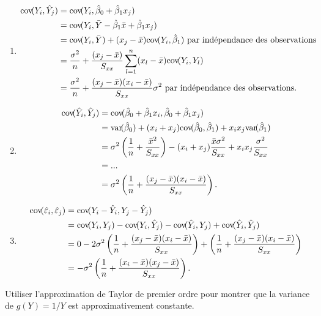 \begin{solution}{2.20}
\begin{enumerate}
\item
\begin{align*}
\mathrm{cov}\! ( Y_i,\hat{Y}_j )&=\mathrm{cov}\! ( Y_i,\hat{\beta}_0+\hat{\beta}_1x_j )\\
&=\mathrm{cov}\! ( Y_i,\bar{Y}-\hat{\beta}_1\bar{x}+\hat{\beta}_1x_j )\\
&=\mathrm{cov}\! ( Y_i,\bar{Y} )+(x_j-\bar{x})\mathrm{cov}\! ( Y_i,\hat{\beta}_1 ) \mbox{ par indépendance des observations}\\
&=\frac{\sigma^2}{n}+\frac{(x_j-\bar{x})}{S_{xx}}\sum_{l=1}^n(x_l-\bar{x})\mathrm{cov}\! ( Y_i,Y_l )\\
&=\frac{\sigma^2}{n}+\frac{(x_j-\bar{x})(x_i-\bar{x})}{S_{xx}}\sigma^2\mbox{ par indépendance des observations}.\\
\end{align*}

\item
\begin{align*}
\mathrm{cov}\! ( \hat{Y}_i,\hat{Y}_j )&=\mathrm{cov}\! ( \hat{\beta}_0+\hat{\beta}_1x_i,\hat{\beta}_0+\hat{\beta}_1x_j )\\
&=\mathrm{var}\! ( \hat{\beta}_0 )+(x_i+x_j)\mathrm{cov}\! ( \hat{\beta}_0,\hat{\beta}_1 )+x_ix_j\mathrm{var}\! ( \hat{\beta}_1 )\\
&=\sigma^2\left(\frac{1}{n}+\frac{\bar{x}^2}{S_{xx}}\right)-(x_i+x_j)\frac{\bar{x}\sigma^2}{S_{xx}}+x_ix_j\frac{\sigma^2}{S_{xx}}\\
&=...\\
&=\sigma^2\left(\frac{1}{n}+\frac{(x_j-\bar{x})(x_i-\bar{x})}{S_{xx}}\right).
\end{align*}

\item
\begin{align*}
\mathrm{cov}\! ( \hat{\varepsilon}_i,\hat{\varepsilon}_j )&=\mathrm{cov}\! ( Y_i-\hat{Y}_i,Y_j-\hat{Y}_j )\\
&=\mathrm{cov}\! ( Y_i,Y_j )-\mathrm{cov}\! ( Y_i,\hat{Y}_j )-\mathrm{cov}\! ( \hat{Y}_i,Y_j )+\mathrm{cov}\! ( \hat{Y}_i,\hat{Y}_j )\\
&=0-2\sigma^2\left(\frac{1}{n}+\frac{(x_j-\bar{x})(x_i-\bar{x})}{S_{xx}}\right)+\left(\frac{1}{n}+\frac{(x_j-\bar{x})(x_i-\bar{x})}{S_{xx}}\right)\\
&=-\sigma^2\left(\frac{1}{n}+\frac{(x_i-\bar{x})(x_j-\bar{x})}{S_{xx}}\right).
\end{align*}
\end{enumerate}
\end{solution}
\begin{solution}{2.21}
Utiliser l'approximation de Taylor de premier ordre pour montrer que la variance de $g(Y)=1/Y$ est approximativement constante.
\end{solution}
